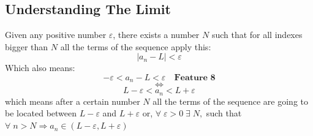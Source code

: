 \subsection{Understanding The Limit}
Given any positive number $\varepsilon$, there exists a number $N$ such that for all indexes bigger than $N$ all the terms of the sequence apply this:\\
\[
    |a_n-L|<\varepsilon
\]
Which also means:
\[
    -\varepsilon<a_n-L<\varepsilon \quad \textbf{Feature 8}
\]
\[
    \iff
\]
\[
    L-\varepsilon<a_n<L+\varepsilon
\]
which means after a certain number $N$ all the terms of the sequence are going to be located between $L-\varepsilon$ and $L+\varepsilon$ or, $\forall \; \varepsilon>0 \; \exists \; N,$ such that $\forall\; n>N \Longrightarrow a_n\in (L-\varepsilon,L+\varepsilon)$

